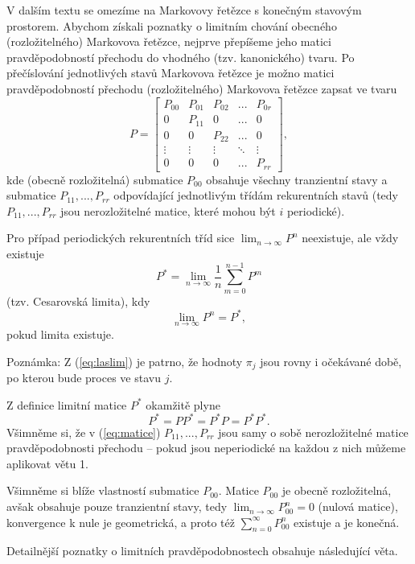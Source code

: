 \documentclass[10pt]{article}
\begin{document}
V dalším textu se omezíme na Markovovy řetězce s konečným stavovým prostorem. Abychom získali poznatky o limitním chování obecného (rozložitelného) Markovova řetězce, nejprve přepíšeme jeho matici pravděpodobností přechodu do vhodného (tzv. kanonického) tvaru. Po přečíslování jednotlivých stavů Markovova řetězce je možno matici pravděpodobností přechodu (rozložitelného) Markovova řetězce zapsat ve tvaru \begin{equation}\label{eq:matice} P = \begin{bmatrix}
P_{00} & P_{01} & P_{02}&... & P_{0r}\\
0& P_{11}&0&...&0\\
0& 0& P_{22}&...&0\\
\vdots & \vdots & \vdots & \ddots & \vdots \\
0 & 0 & 0 & ... & P_{rr}
\end{bmatrix},\end{equation} kde (obecně rozložitelná) submatice $P_{00}$ obsahuje všechny tranzientní stavy a submatice $P_{11},...,P_{rr}$ odpovídající jednotlivým třídám rekurentních stavů (tedy $P_{11},...,P_{rr}$ jsou nerozložitelné matice, které mohou být $i$ periodické).

Pro případ periodických rekurentních tříd sice $\lim_{n \to \infty} P^n$ neexistuje, ale vždy existuje
\begin{equation}
\label{eq:laslim}
P^* = \lim_{n \to \infty} \frac{1}{n} \sum_{m=0}^{n-1} P^m
\end{equation}
(tzv. Cesarovská limita), kdy $$\lim_{n \to \infty} P^n = P^*,$$ pokud limita existuje.

Poznámka: Z (\ref{eq:laslim}) je patrno, že hodnoty $\pi_j$ jsou rovny i očekávané době, po kterou bude proces ve stavu $j$.

Z definice limitní matice $P^*$ okamžitě plyne $$P^* = P P^* = P^* P = P^* P^*.$$ Všimněme si, že v (\ref{eq:matice}) $P_{11},...,P_{rr}$ jsou samy o sobě nerozložitelné matice pravděpodobnosti přechodu -- pokud jsou neperiodické na každou z nich můžeme aplikovat větu 1.

Všimněme si blíže vlastností submatice $P_{00}$. Matice $P_{00}$ je obecně rozložitelná, avšak obsahuje pouze tranzientní stavy, tedy $\lim_{n \to \infty} P_{00}^n = 0$ (nulová matice), konvergence k nule je geometrická, a proto též $\sum_{n=0}^{\infty} P_{00}^n$ existuje a je konečná.

Detailnější poznatky o limitních pravděpodobnostech obsahuje následující věta.
\end{document}
